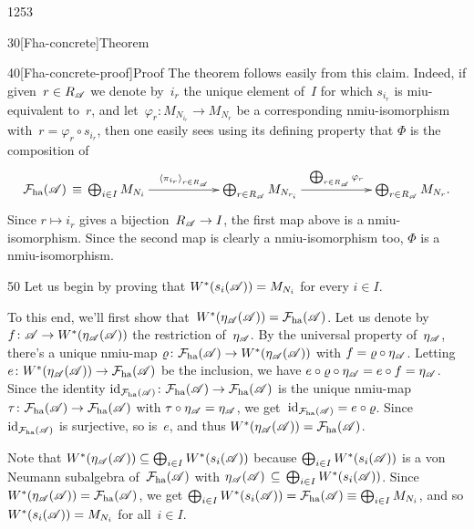\begin{parsec}{1253}
\begin{point}{30}[Fha-concrete]{Theorem}
\begin{point}{40}[Fha-concrete-proof]{Proof}
The theorem follows easily from this claim.
Indeed, if given~$r\in R_{\mathscr{A}}$
we denote
by~$i_r$ the unique element of~$I$
    for which $s_{i_r}$ is miu-equivalent to~$r$,
    and let~$\varphi_r\colon M_{N_{i_r}}\to M_{N_{r}}$
    be a corresponding nmiu-isomorphism with~$r = \varphi_r\circ s_{i_r}$,
then one easily sees using its defining property
    that $\Phi$ is the composition of
\begin{equation*}
\xymatrix@C=5.5em{
\mathcal{F}_\mathrm{ha}(\scrA)\,\equiv\,
\bigoplus_{i \in I} M_{N_i}
    \ar[r]^-{\left<\pi_{i_r} \right>_{r\in R_\scrA}}
    & 
    \bigoplus_{r\in R_\scrA}
    M_{N_{r_i}}
    \ar[r]^-{\bigoplus_{r\in R_\scrA} \varphi_r}
    &
    \bigoplus_{r\in R_\scrA} M_{N_r}.
}
\end{equation*}
Since $r\mapsto i_r$ gives a bijection~$R_{\mathscr{A}}\to I$,
the first map above
is a nmiu-isomorphism.
Since the second map is clearly a nmiu-isomorphism
too, $\Phi$ is a nmiu-isomorphism.
\begin{point}{50}
Let us begin by proving that $W^*(s_i(\mathscr{A}))=M_{N_i}$
for every $i\in I$.

To this end, we'll first show 
that~$W^*(\eta_{\mathscr{A}}(\mathscr{A}))=\mathcal{F}_\mathrm{ha}(\mathscr{A})$.
Let us denote by $f\colon \mathscr{A}\to W^*(\eta_{\mathscr{A}}(\mathscr{A}))$
the restriction of~$\eta_{\mathscr{A}}$.
By the universal property of~$\eta_{\mathscr{A}}$,
    there's a unique nmiu-map $\varrho\colon \mathcal{F}_\mathrm{ha}(\mathscr{A})
    \to W^*(\eta_{\mathscr{A}}(\mathscr{A}))$
    with $f = \varrho\circ \eta_{\mathscr{A}}$.
Letting $e\colon W^*(\eta_{\mathscr{A}}(\mathscr{A}))\to \mathcal{F}_\mathrm{ha}(\mathscr{A})$
be the inclusion,
we have $e\circ \varrho \circ \eta_{\mathscr{A}} = e\circ f = \eta_{\mathscr{A}}$.
    Since the identity $\mathrm{id}_{\mathcal{F}_\mathrm{ha}(\mathscr{A})}\colon \mathcal{F}_\mathrm{ha}(\mathscr{A})
\to \mathcal{F}_\mathrm{ha}(\mathscr{A})$
is the unique nmiu-map $\tau\colon \mathcal{F}_\mathrm{ha}(\mathscr{A})
\to \mathcal{F}_\mathrm{ha}(\mathscr{A})$
with $\tau\circ \eta_{\mathscr{A}} = \eta_{\mathscr{A}}$,
    we get~$\mathrm{id}_{\mathcal{F}_\mathrm{ha}(\mathscr{A})}= e\circ \varrho$.
    Since~$\mathrm{id}_{\mathcal{F}_\mathrm{ha}(\mathscr{A})}$ is surjective,
    so is~$e$, and thus $W^*(\eta_{\mathscr{A}}(\mathscr{A}))=\mathcal{F}_\mathrm{ha}(
    \mathscr{A})$.

Note that $W^*(\eta_{\mathscr{A}}(\mathscr{A}))
    \subseteq \bigoplus_{i\in I}
    W^*(s_i(\mathscr{A}))$
    because $\bigoplus_{i\in I} W^*(s_i(\mathscr{A}))$
    is a von Neumann subalgebra
    of~$\mathcal{F}_\mathrm{ha}(\mathscr{A})$
    with $\eta_{\mathscr{A}}(\mathscr{A}) 
    \,\subseteq\, \bigoplus_{i\in I} W^*(s_i(\mathscr{A}))$.
    Since $W^*(\eta_{\mathscr{A}}(\mathscr{A}))=
    \mathcal{F}_\mathrm{ha}(
    \mathscr{A})$,
    we get 
    $\bigoplus_{i\in I} W^*(s_i(\mathscr{A}))=
    \mathcal{F}_\mathrm{ha}(\mathscr{A})
    \equiv \bigoplus_{ i \in I} M_{N_i}$,
    and so $W^*(s_i(\mathscr{A}))=M_{N_i}$
    for all~$i\in I$.


\end{point}
\end{point}
\end{point}
\end{parsec}
